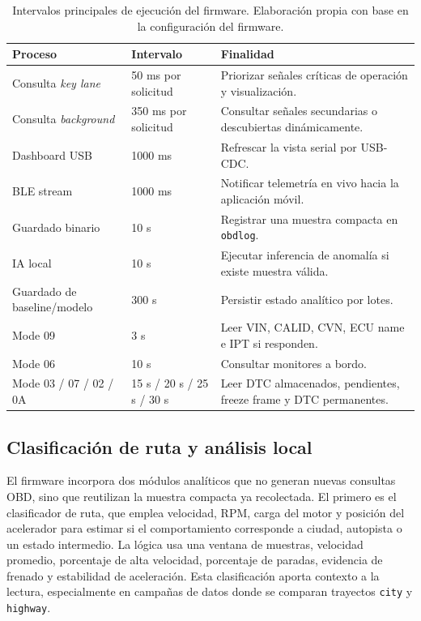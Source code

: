 \documentclass[12pt,letterpaper]{report}
\begin{document}
\begin{table}[!htbp]
\centering
\caption{Intervalos principales de ejecución del firmware. Elaboración propia con base en la configuración del firmware.}
\label{tab:firmware-intervalos}
\renewcommand{\arraystretch}{1.08}
\setlength{\tabcolsep}{5pt}
\small
\begin{tabular}{@{}p{}p{}p{}@{}}
\toprule
Proceso & Intervalo & Finalidad \\
\midrule
Consulta \emph{key lane} & 50 ms por solicitud & Priorizar señales críticas de operación y visualización. \\
Consulta \emph{background} & 350 ms por solicitud & Consultar señales secundarias o descubiertas dinámicamente. \\
Dashboard USB & 1000 ms & Refrescar la vista serial por USB-CDC. \\
BLE stream & 1000 ms & Notificar telemetría en vivo hacia la aplicación móvil. \\
Guardado binario & 10 s & Registrar una muestra compacta en \texttt{obdlog}. \\
IA local & 10 s & Ejecutar inferencia de anomalía si existe muestra válida. \\
Guardado de baseline/modelo & 300 s & Persistir estado analítico por lotes. \\
Mode 09 & 3 s & Leer VIN, CALID, CVN, ECU name e IPT si responden. \\
Mode 06 & 10 s & Consultar monitores a bordo. \\
Mode 03 / 07 / 02 / 0A & 15 s / 20 s / 25 s / 30 s & Leer DTC almacenados, pendientes, freeze frame y DTC permanentes. \\
\bottomrule
\end{tabular}
\end{table}

\subsection{Clasificación de ruta y análisis local}

El firmware incorpora dos módulos analíticos que no generan nuevas consultas OBD, sino que reutilizan la muestra compacta ya recolectada. El primero es el clasificador de ruta, que emplea velocidad, RPM, carga del motor y posición del acelerador para estimar si el comportamiento corresponde a ciudad, autopista o un estado intermedio. La lógica usa una ventana de muestras, velocidad promedio, porcentaje de alta velocidad, porcentaje de paradas, evidencia de frenado y estabilidad de aceleración. Esta clasificación aporta contexto a la lectura, especialmente en campañas de datos donde se comparan trayectos \texttt{city} y \texttt{highway}.
\end{document}
